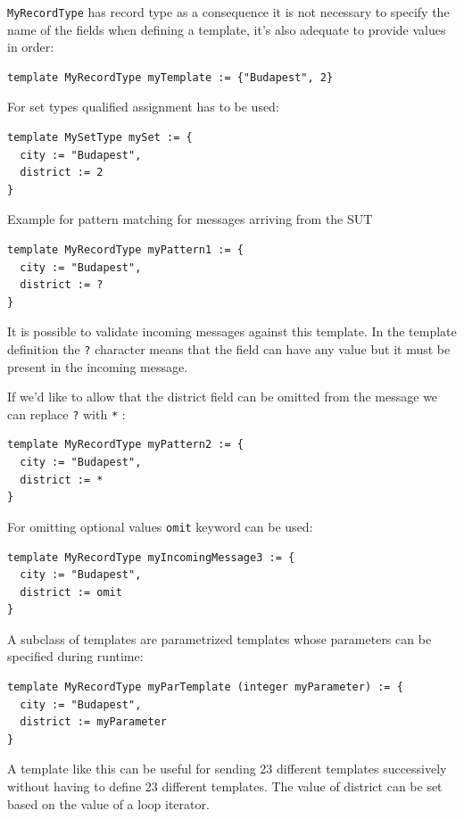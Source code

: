 \documentclass[a4paper]{article}
\begin{document}
\verb/MyRecordType/ has record type as a consequence it is not necessary to specify the name of the fields
when defining a template, it's also adequate to provide values in order:
{\footnotesize
\begin{lstlisting}
template MyRecordType myTemplate := {"Budapest", 2}
\end{lstlisting}
}

For set types qualified assignment has to be used:
{\footnotesize
\begin{lstlisting}
template MySetType mySet := {
  city := "Budapest",
  district := 2
}
\end{lstlisting}
}

Example for pattern matching for messages arriving from the SUT
    {\footnotesize
        \begin{lstlisting}
template MyRecordType myPattern1 := {
  city := "Budapest",
  district := ?
}
\end{lstlisting}
    }

It is possible to validate incoming messages against this template.
In the template definition the \verb/?/ character means that the field can have any value but it
must be present in the incoming message.

If we'd like to allow that the district field can be omitted from the message we can replace
\verb/?/ with \verb/*/ :
{\footnotesize
\begin{lstlisting}
template MyRecordType myPattern2 := {
  city := "Budapest",
  district := *
}
\end{lstlisting}
}

For omitting optional values \verb/omit/ keyword can be used:
{\footnotesize
\begin{lstlisting}
template MyRecordType myIncomingMessage3 := {
  city := "Budapest",
  district := omit
}
\end{lstlisting}
}

A subclass of templates are parametrized templates whose parameters can be specified during runtime:

{\footnotesize
\begin{lstlisting}
template MyRecordType myParTemplate (integer myParameter) := {
  city := "Budapest",
  district := myParameter
}
\end{lstlisting}
}

A template like this can be useful for sending 23 different templates successively without having to define 23
different templates. The value of district can be set based on the value of a loop iterator.
\end{document}

